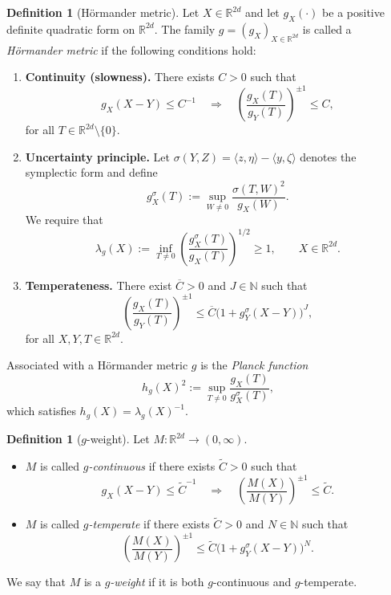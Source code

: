 \documentclass[12pt,reqno,a4paper]{amsart}
\numberwithin{equation}{section}
\theoremstyle{plain}
\theoremstyle{definition}
\newtheorem{definition}[theorem]{Definition}
\theoremstyle{remark}
\begin{document}
\begin{definition}[H\"ormander metric]\label{HM}
Let $X\in\mathbb{R}^{2d}$ and let $g_X(\cdot)$ be a positive definite quadratic
form on $\mathbb{R}^{2d}$. The family $g=(g_X)_{X\in\mathbb{R}^{2d}}$ is called a
\emph{H\"ormander metric} if the following conditions hold:
\begin{enumerate}
\item[\rm (I)] \textbf{Continuity (slowness).}
There exists $C>0$ such that
\[
g_X(X-Y)\le C^{-1}
\quad\Longrightarrow\quad
\left(\frac{g_X(T)}{g_Y(T)}\right)^{\pm1}\le C,
\]
for all $T\in\mathbb{R}^{2d}\setminus\{0\}$.

\item[\rm (II)] \textbf{Uncertainty principle.}
Let $\sigma(Y,Z)=\langle z,\eta\rangle-\langle y,\zeta\rangle$
denotes the symplectic form and define
\[
g_X^{\sigma}(T)
:= \sup_{W\neq0}\frac{\sigma(T,W)^2}{g_X(W)}.
\]
We require that
\[
\lambda_g(X)
:= \inf_{T\neq0}\left(\frac{g_X^{\sigma}(T)}{g_X(T)}\right)^{1/2}
\ge 1,
\qquad X\in\mathbb{R}^{2d}.
\]

\item[\rm (III)] \textbf{Temperateness.}
There exist $\overline{C}>0$ and $J\in\mathbb{N}$ such that
\[
\left(\frac{g_X(T)}{g_Y(T)}\right)^{\pm1}
\le \overline{C}\bigl(1+g_Y^{\sigma}(X-Y)\bigr)^J,
\]
for all $X,Y,T\in\mathbb{R}^{2d}$.
\end{enumerate}
\end{definition}

Associated with a H\"ormander metric $g$ is the \emph{Planck function}
\[
h_g(X)^2
:= \sup_{T\neq0}\frac{g_X(T)}{g_X^{\sigma}(T)},
\]
which satisfies $h_g(X)=\lambda_g(X)^{-1}$.

\begin{definition}[$g$-weight]\label{GW}
Let $M:\mathbb{R}^{2d}\to(0,\infty)$.
\begin{itemize}
\item $M$ is called \emph{$g$-continuous} if there exists $\tilde{C}>0$ such that
\[
g_X(X-Y)\le \tilde{C}^{-1}
\quad\Longrightarrow\quad
\left(\frac{M(X)}{M(Y)}\right)^{\pm1}\le \tilde{C}.
\]

\item $M$ is called \emph{$g$-temperate} if there exists $\tilde{C}>0$ and
$N\in\mathbb{N}$ such that
\[
\left(\frac{M(X)}{M(Y)}\right)^{\pm1}
\le \tilde{C}\bigl(1+g_Y^{\sigma}(X-Y)\bigr)^N.
\]
\end{itemize}
We say that $M$ is a \emph{$g$-weight} if it is both $g$-continuous and
$g$-temperate.
\end{definition}
\end{document}
